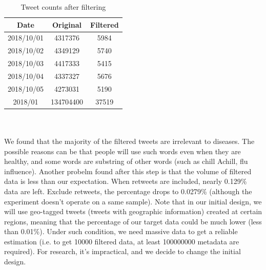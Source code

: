 \begin{table}[!htbp]
    \centering
    \hspace{0.5cm}
    \begin{tabular}{ccc}
        Date & Original & Filtered \\ \hline
        2018/10/01 & 4317376 & 5984 \\
        2018/10/02 & 4349129 & 5740 \\
        2018/10/03 & 4417333 & 5415 \\
        2018/10/04 & 4337327 & 5676 \\
        2018/10/05 & 4273031 & 5190 \\
        2018/01 & 134704400 & 37519 \\
    \end{tabular}
    \caption{Tweet counts after filtering}
    \label{tab:filtering}
\end{table}
\\\\
We found that the majority of the filtered tweets are irrelevant to diseases. The possible reasons can be that people will use such words even when they are healthy, and some words are substring of other words (such as chill Achill, flu influence). Another probelm found after this step is that the volume of filtered data is less than our expectation. When retweets are included, nearly 0.129\% data are left. Exclude retweets, the percentage drops to 0.0279\% (although the experiment doesn't operate on a same sample). Note that in our initial design, we will use geo-tagged tweets (tweets with geographic information) created at certain regions, meaning that the percentage of our target data could be much lower (less than 0.01\%). Under such condition, we need massive data to get a reliable estimation (i.e. to get 10000 filtered data, at least 100000000 metadata are required). For research, it's impractical, and we decide to change the initial design.

